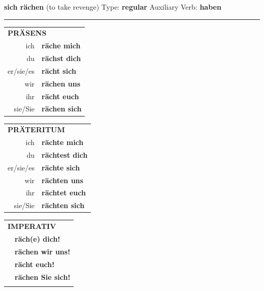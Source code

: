 \documentclass[10pt,a4paper]{revtex4-2}
\begin{document}
\begin{verbbox}
    {\Large \bf sich rächen} (to take revenge) \hfill Type: \textbf{regular} \hfill Auxiliary Verb: \textbf{haben} 
    
     \vspace{5pt}

    \hrule
    
    \vspace{5pt}

  \begin{tabular}{rl}
     \multicolumn{2}{l}{\textbf{PRÄSENS} }\\
    ich & \textbf{räche mich}\\
    du & \textbf{rächst dich}\\
    er/sie/es & \textbf{rächt sich}\\
    wir & \textbf{rächen uns}\\
    ihr & \textbf{rächt euch}\\
    sie/Sie & \textbf{rächen sich}\\
  \end{tabular}
  \hfill
     \begin{tabular}{rl}
    \multicolumn{2}{l}{\textbf{PRÄTERITUM} }\\
    ich & \textbf{rächte mich}\\
    du & \textbf{rächtest dich}\\
    er/sie/es & \textbf{rächte sich}\\
    wir & \textbf{rächten uns}\\
    ihr & \textbf{rächtet euch}\\
    sie/Sie & \textbf{rächten sich}\\
  \end{tabular}
  \hfill
  \begin{tabular}{rl}
     \multicolumn{2}{l}{\textbf{IMPERATIV} }\\
   & \textbf{räch(e) dich!}\\
   & \textbf{rächen wir uns!}\\
   & \textbf{rächt euch!}\\
   & \textbf{rächen Sie sich!}\\
   & \vspace{10pt}
  \end{tabular}

    \vspace{10pt}


\end{verbbox}
\end{document}
